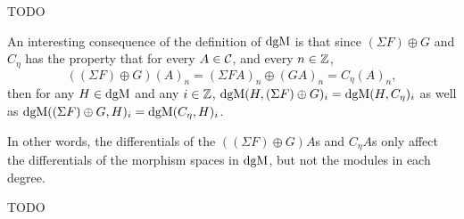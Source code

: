 TODO

\begin{remark}
    \label{rem:dgm_different_dg_morphisms_same_space_give_degree-wise_same_morphisms}
    An interesting consequence of the definition of \( \operatorname{dgM} \) is that since \( (\Sigma F) \oplus G \) and \( C_{\eta} \) has the property that for every \( A \in {\mathcal{C}} \), and every \( n \in {\mathbb{Z}} \),
    \[
        ((\Sigma F) \oplus G)(A)_n = (\Sigma F A)_n \oplus (G A)_n = C_{\eta}(A)_n,
    \]
    then for any \( H \in \operatorname{dgM} \) and any \( i \in {\mathbb{Z}} \), \( \operatorname{dgM}(H, (\Sigma F) \oplus G)_i = \operatorname{dgM}(H, C_{\eta})_i \) as well as \( \operatorname{dgM}((\Sigma F) \oplus G, H)_i = \operatorname{dgM}(C_{\eta}, H)_i \).

    In other words, the differentials of the \( ((\Sigma F) \oplus G) A \)s and \( C_{\eta} A \)s only affect the differentials of the morphism spaces in \( \operatorname{dgM} \), but not the modules in each degree.
\end{remark}

TODO

